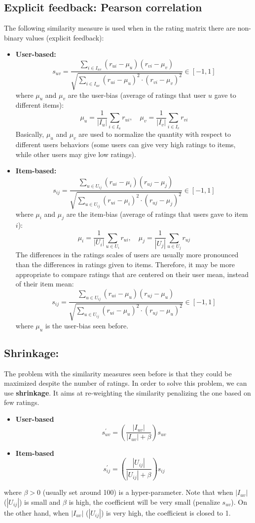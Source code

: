 \subsection{Explicit feedback: Pearson correlation}
The following similarity measure is used when in the rating matrix there are non-binary values (explicit feedback):
\begin{itemize}
    \item \textbf{User-based:}
    \[s_{uv} = \frac{\sum_{i \in I_{uv}}(r_{ui} - \mu_{u}) (r_{vi} - \mu_{v})}{\sqrt{\sum_{i \in I_{uv}}(r_{ui} - \mu_{u})^{2} \cdot (r_{vi} - \mu_{v})^{2}}} \in [-1, 1]\]
    where $\mu_{u}$ and $\mu_{v}$ are the user-bias (average of ratings that user $u$ gave to different items):
    \[\mu_{u} = \frac{1}{|I_{u}|}\sum_{i \in I_{u}}r_{ui}, \quad \mu_{v} = \frac{1}{|I_{v}|}\sum_{i \in I_{v}}r_{vi}\]
    Basically, $\mu_{u}$ and $\mu_{v}$ are used to normalize the quantity with respect to different users behaviors (some users can give very high ratings to items, while other users may give low ratings).

    \item \textbf{Item-based:}
    \[s_{ij} = \frac{\sum_{u \in U_{ij}}(r_{ui} - \mu_{i}) (r_{uj} - \mu_{j})}{\sqrt{\sum_{u \in U_{ij}}(r_{ui} - \mu_{i})^{2} \cdot (r_{uj} - \mu_{j})^{2}}} \in [-1, 1]\]
    where $\mu_{i}$ and $\mu_{j}$ are the item-bias (average of ratings that users gave to item $i$):
    \[\mu_{i} = \frac{1}{|U_{i}|}\sum_{u \in U_{i}}r_{ui}, \quad \mu_{j} = \frac{1}{|U_{j}|}\sum_{u \in U_{j}}r_{uj}\]
    The differences in the ratings scales of users are usually more pronounced than the differences in ratings given to items. Therefore, it may be more appropriate to compare ratings that are centered on their user mean, instead of their item mean:
    \[s_{ij} = \frac{\sum_{u \in U_{ij}}(r_{ui} - \mu_{u}) (r_{uj} - \mu_{u})}{\sqrt{\sum_{u \in U_{ij}}(r_{ui} - \mu_{u})^{2} \cdot (r_{uj} - \mu_{u})^{2}}} \in [-1, 1]\]
    where $\mu_{u}$ is the user-bias seen before.
\end{itemize}
\subsection{Shrinkage:}
The problem with the similarity measures seen before is that they could be maximized despite the number of ratings. In order to solve this problem, we can use \textbf{shrinkage}. It aims at re-weighting the similarity penalizing the one based on few ratings.
\begin{itemize}
    \item \textbf{User-based}
    \[s^{'}_{uv} = \left( \frac{|I_{uv}|}{|I_{uv}| + \beta} \right) s_{uv}\]

    \item \textbf{Item-based}
    \[s^{'}_{ij} = \left( \frac{|U_{ij}|}{|U_{ij}| + \beta} \right) s_{ij}\]
\end{itemize}
where $\beta > 0$ (usually set around 100) is a hyper-parameter. Note that when $|I_{uv}|$ ($|U_{ij}|$) is small and $\beta$ is high, the coefficient will be very small (penalize $s_{uv}$). On the other hand, when $|I_{uv}|$ ($|U_{ij}|$) is very high, the coefficient is closed to 1. 
